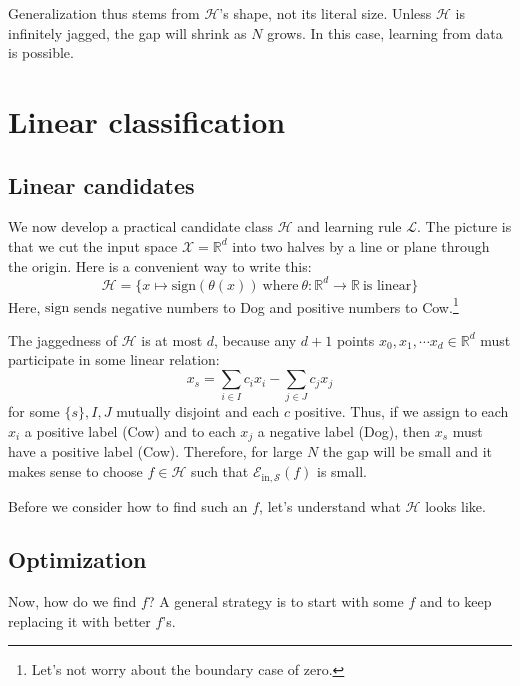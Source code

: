 \documentclass[openany, notitlepage, justified]{tufte-book}
\newcommand{\RR}{\mathbb{R}}
\newcommand{\Ee}{\mathcal{E}}
\newcommand{\Hh}{\mathcal{H}}
\newcommand{\Ll}{\mathcal{L}}
\newcommand{\Ss}{\mathcal{S}}
\newcommand{\Xx}{\mathcal{X}}
\newcommand{\Ein}{\Ee_{\text{in},\Ss}}
\begin{document}
            Generalization thus stems from $\Hh$'s shape, not its literal size.
            Unless $\Hh$ is infinitely jagged, the gap will shrink as $N$
            grows.  In this case, learning from data is possible.

    \newpage
    \chapter{Linear classification}
        \section{Linear candidates}
            We now develop a practical candidate class $\Hh$ and learning rule
            $\Ll$.  The picture is that we cut the input space $\Xx=\RR^d$ into
            two halves by a line or plane through the origin.  Here is a
            convenient way to write this:
            $$
                \Hh = \{
                    x \mapsto \text{sign}(\theta(x)) 
                    ~\text{where}~
                    \theta : \RR^d \to \RR
                    ~\text{is linear}
                \}
            $$
            Here, $\text{sign}$ sends negative numbers to Dog and
            positive numbers to Cow.\footnote{
                Let's not worry about the boundary case of zero.
            }

            The jaggedness of $\Hh$ is at most $d$, because any $d+1$ points
            $x_0, x_1,\cdots x_d \in \RR^d$ must participate in some linear
            relation:
            $$
                x_s = 
                \sum_{i\in I} c_i x_i
                -
                \sum_{j\in J} c_j x_j
            $$
            for some $\{s\},I,J$ mutually disjoint and each $c$ positive.
            Thus, if we assign to each $x_i$ a positive label (Cow) and to each
            $x_j$ a negative label (Dog), then $x_s$ must have a positive label
            (Cow). 
            Therefore, for large $N$ the gap will be small and it makes sense
            to choose $f\in \Hh$ such that $\Ein(f)$ is small.  

            Before we consider how to find such an $f$, let's understand what
            $\Hh$ looks like.

            \newpage
        \section{Optimization}

            Now, how do we find $f$?  A general strategy is to start with
            some $f$ and to keep replacing it with better $f$'s.
\end{document}
